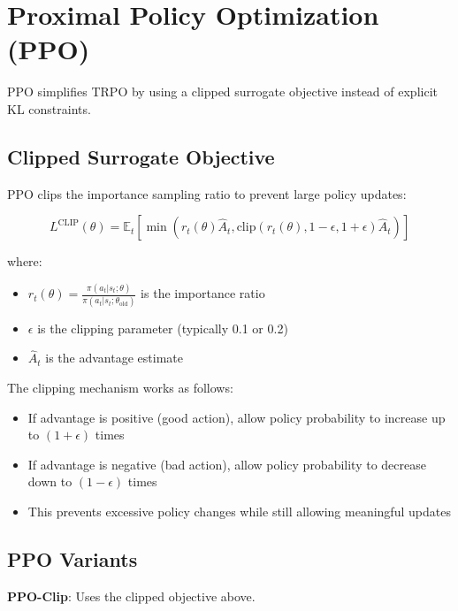 \section{Proximal Policy Optimization (PPO)}

PPO simplifies TRPO by using a clipped surrogate objective instead of explicit KL constraints.

\subsection{Clipped Surrogate Objective}

PPO clips the importance sampling ratio to prevent large policy updates:

\begin{equation}
L^{\text{CLIP}}(\theta) = \mathbb{E}_t \left[ \min \left( r_t(\theta) \hat{A}_t, \text{clip}(r_t(\theta), 1-\epsilon, 1+\epsilon) \hat{A}_t \right) \right]
\end{equation}

where:
\begin{itemize}
    \item $r_t(\theta) = \frac{\pi(a_t|s_t; \theta)}{\pi(a_t|s_t; \theta_{\text{old}})}$ is the importance ratio
    \item $\epsilon$ is the clipping parameter (typically 0.1 or 0.2)
    \item $\hat{A}_t$ is the advantage estimate
\end{itemize}

\begin{intuitionbox}
The clipping mechanism works as follows:
\begin{itemize}
    \item If advantage is positive (good action), allow policy probability to increase up to $(1+\epsilon)$ times
    \item If advantage is negative (bad action), allow policy probability to decrease down to $(1-\epsilon)$ times  
    \item This prevents excessive policy changes while still allowing meaningful updates
\end{itemize}
\end{intuitionbox}

\subsection{PPO Variants}

\textbf{PPO-Clip}: Uses the clipped objective above.

